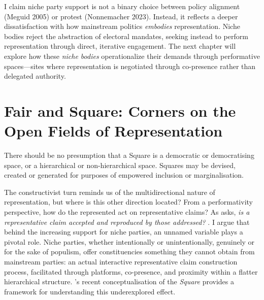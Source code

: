 I claim niche party support is not a binary choice between policy alignment (Meguid 2005) or protest (Nonnemacher 2023). Instead, it reflects a deeper dissatisfaction with how mainstream politics \textit{embodies} representation. Niche bodies reject the abstraction of electoral mandates, seeking instead to perform representation through direct, iterative engagement. The next chapter will explore how these \textit{niche bodies} operationalize their demands through performative spaces—sites where representation is negotiated through co-presence rather than delegated authority.



\chapter{Fair and Square: Corners on the Open Fields of Representation}

\epigraph{There should be no presumption that a Square is a democratic or democratising space, or a hierarchical or non-hierarchical space. Squares may be devised, created or generated for purposes of empowered inclusion or marginalisation.}{\cite[11]{saward2024}}

The constructivist turn \parencite[]{disch2015} reminds us of the multidirectional nature of representation, but where is this other direction located? From a performativity perspective, how do the represented act on representative claims? As \cite{kim2024} asks, \textit{is a representative claim accepted and reproduced by those addressed?} \parencite[4]{kim2024}. I argue that behind the increasing support for niche parties, an unnamed variable plays a pivotal role. Niche parties, whether intentionally or unintentionally, genuinely or for the sake of populism, offer constituencies something they cannot obtain from mainstream parties: an actual interactive representative claim construction process, facilitated through platforms, co-presence, and proximity within a flatter hierarchical structure. \textcite{saward2024}'s recent conceptualisation of the \emph{Square} provides a framework for understanding this underexplored effect.


